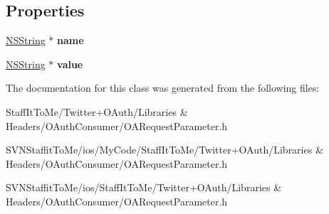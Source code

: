 \subsection*{\-Properties}
\begin{DoxyCompactItemize}
\item 
\hypertarget{interface_o_a_request_parameter_abb650f79c5a7ebfc4166300b9339a9f2}{
\hyperlink{class_n_s_string}{\-N\-S\-String} $\ast$ {\bfseries name}}
\label{interface_o_a_request_parameter_abb650f79c5a7ebfc4166300b9339a9f2}

\item 
\hypertarget{interface_o_a_request_parameter_a79513165a95aab397e35d368793db9ba}{
\hyperlink{class_n_s_string}{\-N\-S\-String} $\ast$ {\bfseries value}}
\label{interface_o_a_request_parameter_a79513165a95aab397e35d368793db9ba}

\end{DoxyCompactItemize}


\-The documentation for this class was generated from the following files\-:\begin{DoxyCompactItemize}
\item 
\-Staff\-It\-To\-Me/\-Twitter+\-O\-Auth/\-Libraries \& Headers/\-O\-Auth\-Consumer/\-O\-A\-Request\-Parameter.\-h\item 
\-S\-V\-N\-Staffit\-To\-Me/ios/\-My\-Code/\-Staff\-It\-To\-Me/\-Twitter+\-O\-Auth/\-Libraries \& Headers/\-O\-Auth\-Consumer/\-O\-A\-Request\-Parameter.\-h\item 
\-S\-V\-N\-Staffit\-To\-Me/ios/\-Staff\-It\-To\-Me/\-Twitter+\-O\-Auth/\-Libraries \& Headers/\-O\-Auth\-Consumer/\-O\-A\-Request\-Parameter.\-h\end{DoxyCompactItemize}
